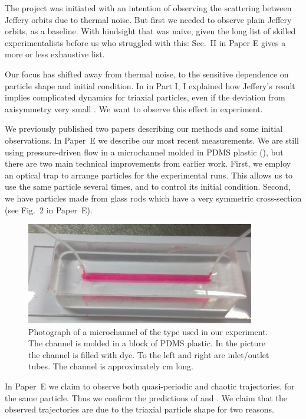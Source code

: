 \documentclass[thesis.tex]{subfiles}
\begin{document}
The project was initiated with an intention of observing the scattering between Jeffery orbits due to thermal noise. But first we needed to observe plain Jeffery orbits, as a baseline. With hindsight that was naive, given the long list of skilled experimentalists before us who struggled with this: Sec.~II in Paper E gives a more or less exhaustive list. 

Our focus has shifted away from thermal noise, to the sensitive dependence on particle shape and initial condition. In  in Part I, I explained how Jeffery's result implies complicated dynamics for triaxial particles, even if the deviation from axisymmetry very small \cite{hinch1979,yarin1997}. We want to observe this effect in experiment.

We previously published two papers \cite{mishra2012,einarsson2013} describing our methods and some initial observations. In Paper~E we describe our most recent measurements. We are still using pressure-driven flow in a microchannel molded in PDMS plastic (), but there are two main technical improvements from earlier work. First, we employ an optical trap to arrange particles for the experimental runs. This allows us to use the same particle several times, and to control its initial condition. Second, we have particles made from glass rods which have a very symmetric cross-section (see Fig.~2 in Paper~E).

\begin{figure}
\includegraphics[width=10cm]{figs/expsetup_hires.png}%
\caption{\label{fig:exp_setup} Photograph of a microchannel of the type used in our experiment. The channel is molded in a block of PDMS plastic. In the picture the channel is filled with dye. To the left and right are inlet/outlet tubes. The channel is approximately \unit[5]{cm} long.}%
\end{figure}

In Paper~E we claim to observe both quasi-periodic and chaotic trajectories, for the same particle. Thus we confirm the predictions of \citet{hinch1979} and \citet{yarin1997}. We claim that the observed trajectories are due to the triaxial particle shape for two reasons. 
\end{document}
